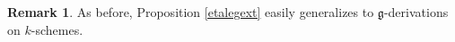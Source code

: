 \documentclass[10pt]{amsart}
\theoremstyle{definition}
\newtheorem{remark}[theorem]{Remark}
\begin{document}
\begin{remark}\label{etalegextsch}
As before, Proposition \ref{etalegext} easily generalizes to $\mathfrak{g}$-derivations on $k$-schemes.
\end{remark}
\end{document}
